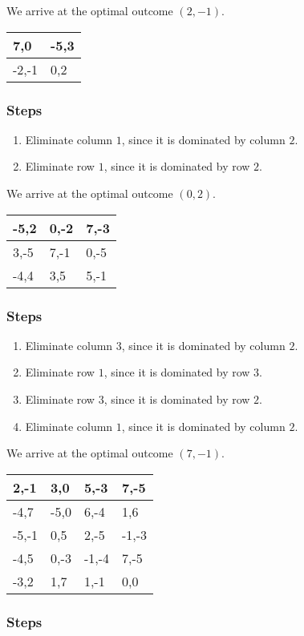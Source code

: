 \documentclass{article}
\begin{document}
We arrive at the optimal outcome $(2, -1)$.
\newpage
\begin{table}[]
\centering
\begin{tabular}{|l|l|}
\hline7,0 & -5,3\\ \hline
-2,-1 & 0,2\\ \hline
\end{tabular}
\end{table}\subsubsection*{Steps}
\begin{enumerate}
\item Eliminate column $1$, since it is dominated by column $2$.
\item Eliminate row $1$, since it is dominated by row $2$.
\end{enumerate}
We arrive at the optimal outcome $(0, 2)$.
\newpage
\begin{table}[]
\centering
\begin{tabular}{|l|l|l|}
\hline-5,2 & 0,-2 & 7,-3\\ \hline
3,-5 & 7,-1 & 0,-5\\ \hline
-4,4 & 3,5 & 5,-1\\ \hline
\end{tabular}
\end{table}\subsubsection*{Steps}
\begin{enumerate}
\item Eliminate column $3$, since it is dominated by column $2$.
\item Eliminate row $1$, since it is dominated by row $3$.
\item Eliminate row $3$, since it is dominated by row $2$.
\item Eliminate column $1$, since it is dominated by column $2$.
\end{enumerate}
We arrive at the optimal outcome $(7, -1)$.
\newpage
\begin{table}[]
\centering
\begin{tabular}{|l|l|l|l|}
\hline2,-1 & 3,0 & 5,-3 & 7,-5\\ \hline
-4,7 & -5,0 & 6,-4 & 1,6\\ \hline
-5,-1 & 0,5 & 2,-5 & -1,-3\\ \hline
-4,5 & 0,-3 & -1,-4 & 7,-5\\ \hline
-3,2 & 1,7 & 1,-1 & 0,0\\ \hline
\end{tabular}
\end{table}\subsubsection*{Steps}
\end{document}
